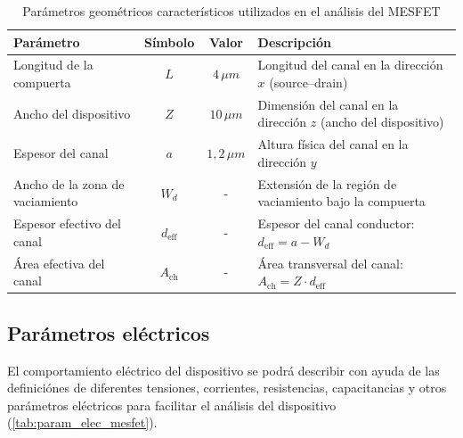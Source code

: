 \documentclass[a4paper]{article}
\begin{document}
\begin{table}[H]
	\centering
	\caption{Parámetros geométricos característicos utilizados en el análisis del MESFET}
	\label{tab:param_geom_mesfet}
	\begin{tabular}{|l|c|c|l|}
		\hline
		\textbf{Parámetro} & \textbf{Símbolo} & \textbf{Valor} & \textbf{Descripción} \\ \hline
		Longitud de la compuerta 
		& $L$ 
		& $4 \,\mu m$
		& Longitud del canal en la dirección $x$ (source--drain) \\ \hline
		
		Ancho del dispositivo 
		& $Z$ 
		& $10 \,\mu m$
		& Dimensión del canal en la dirección $z$ (ancho del dispositivo) \\ \hline
		
		Espesor del canal 
		& $a$ 
		& $1,2 \,\mu m$
		& Altura física del canal en la dirección $y$ \\ \hline
		
		Ancho de la zona de vaciamiento 
		& $W_d$ 
		& -
		& Extensión de la región de vaciamiento bajo la compuerta \\ \hline
		
		Espesor efectivo del canal 
		& $d_{\text{eff}}$ 
		& -
		& Espesor del canal conductor: $d_{\text{eff}} = a - W_d$ \\ \hline
		
		Área efectiva del canal 
		& $A_{\text{ch}}$ 
		& -
		& Área transversal del canal: $A_{\text{ch}} = Z \cdot d_{\text{eff}}$ \\ \hline
		
	
	\end{tabular}
\end{table}



\subsection{Parámetros eléctricos}

El comportamiento eléctrico del dispositivo se podrá describir con ayuda de las definiciónes de diferentes tensiones, corrientes, resistencias, capacitancias y otros parámetros eléctricos para facilitar el análisis del dispositivo (\ref{tab:param_elec_mesfet}). 
\end{document}
